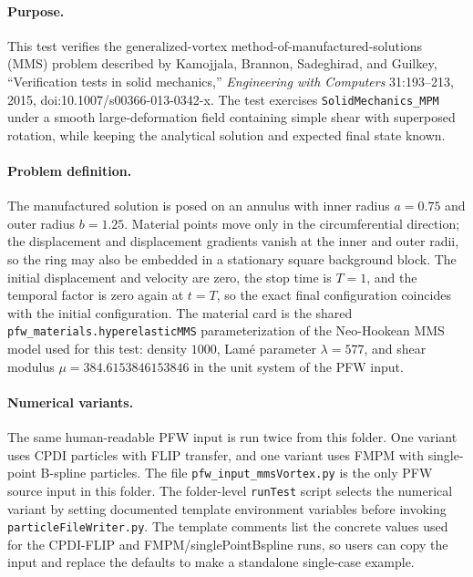 
\paragraph{Purpose.}
This test verifies the generalized-vortex method-of-manufactured-solutions
(MMS) problem described by Kamojjala, Brannon, Sadeghirad, and Guilkey,
``Verification tests in solid mechanics,'' \emph{Engineering with Computers}
31:193--213, 2015, doi:10.1007/s00366-013-0342-x.  The test exercises
\texttt{SolidMechanics\_MPM} under a smooth large-deformation field containing
simple shear with superposed rotation, while keeping the analytical solution and
expected final state known.

\paragraph{Problem definition.}
The manufactured solution is posed on an annulus with inner radius $a=0.75$ and
outer radius $b=1.25$.  Material points move only in the circumferential
direction; the displacement and displacement gradients vanish at the inner and
outer radii, so the ring may also be embedded in a stationary square background
block.  The initial displacement and velocity are zero, the stop time is
$T=1$, and the temporal factor is zero again at $t=T$, so the exact final
configuration coincides with the initial configuration.  The material card is
the shared \texttt{pfw\_materials.hyperelasticMMS} parameterization of the
Neo-Hookean MMS model used for this test: density $1000$, Lam\'e parameter
$\lambda=577$, and shear modulus $\mu=384.6153846153846$ in the unit system of
the PFW input.

\paragraph{Numerical variants.}
The same human-readable PFW input is run twice from this folder.  One variant
uses CPDI particles with FLIP transfer, and one variant uses FMPM with
single-point B-spline particles.  The file \texttt{pfw\_input\_mmsVortex.py} is
the only PFW source input in this folder.  The folder-level \texttt{runTest}
script selects the numerical variant by setting documented template environment
variables before invoking \texttt{particleFileWriter.py}.  The template comments
list the concrete values used for the CPDI-FLIP and FMPM/singlePointBspline
runs, so users can copy the input and replace the defaults to make a standalone
single-case example.

